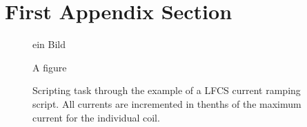 

\appendix

{}	%
{}	%


\section{First Appendix Section}
		\label{appendix}
		
\setcounter{figure}{0}
		
\begin{figure} [ht]
  \centering
   ein Bild
  \caption{A figure}
  \label{fig:BPMNBeispiela}
\end{figure}


\begin{figure} [ht]
  \centering
  \caption{Scripting task through the example of a LFCS current ramping script. All currents are incremented in thenths of the maximum current for the individual coil. }
  \label{fig:ORCA:script}
\end{figure}




